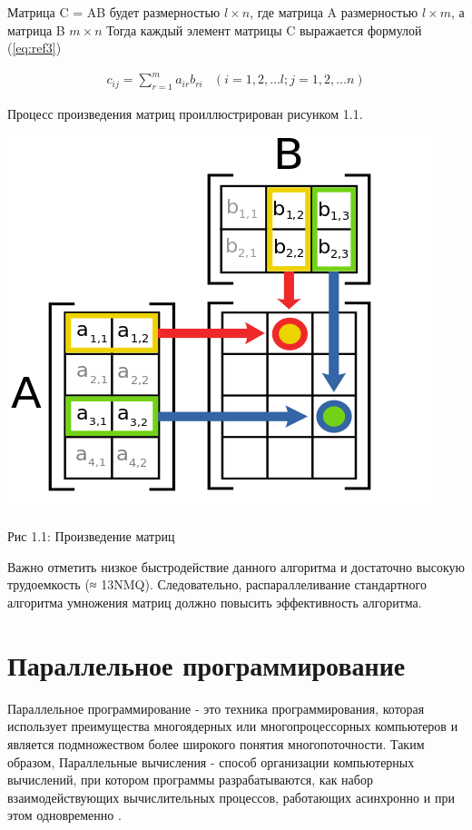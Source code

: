 \documentclass[12pt]{report}
\begin{document}
Матрица C = AB будет размерностью $l \times n$, 
где матрица A размерностью $l \times m$, а матрица B $m \times n$
Тогда каждый элемент матрицы C выражается формулой (\ref{eq:ref3})

\begin{equation}
	\begin{array}{cc}
		c_{ij} = \sum\limits_{r=1}^m a_{ir}b_{ri} & (i=1,2,\dots l; j=1,2,\dots n)
	\end{array}
	\label{eq:ref3}
\end{equation}

Процесс произведения матриц проиллюстрирован рисунком 1.1.

\begin{center}
		\includegraphics[scale=0.6]{pics/matrix_mult.png}
		
			Рис 1.1: Произведение матриц
\end{center}

Важно отметить низкое быстродействие данного алгоритма и достаточно высокую трудоемкость (≈ 13NMQ). Следовательно, распараллеливание стандартного алгоритма умножения матриц должно повысить эффективность алгоритма.

\section{Параллельное программирование}

Параллельное программирование - это техника программирования, которая использует преимущества многоядерных или многопроцессорных компьютеров и является подмножеством более широкого понятия многопоточности. Таким образом, Параллельные вычисления - способ организации компьютерных вычислений, при котором программы разрабатываются, как набор взаимодействующих вычислительных процессов, работающих асинхронно и при этом одновременно \cite{MicrosoftPar}.
\end{document}
